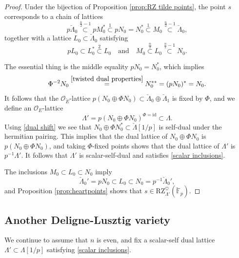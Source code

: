 \documentclass[11pt]{alggeom}
\newcommand{\F}{\mathbb F}
\newcommand{\co}{\mathcal O}
\begin{document}
\begin{proof}
Under the bijection of Proposition \ref{prop:RZ tilde points}, the point $s$ corresponds to a chain of lattices
\[
 p\breve{\Lambda}_0 \stackrel{\frac{n}{2}-1}{\subset}  p M_0^* \stackrel{1}{\subset}  pN_0 =  N_0^* \stackrel{1}{\subset}  M_0 \stackrel{ \frac{n}{2} -1}{\subset} \breve{\Lambda}_0  ,
 \]
together with a lattice $L_0 \subset \breve{\Lambda}_0$ satisfying
 \[
 pL_0 \subset  L_0^* \stackrel{2}{\subset} L_0\quad \mbox{and}\quad   M_0 \stackrel{\frac{n}{2}}{\subset} L_0 \stackrel{\frac{n}{2}-1}{\subset} N_0. 
 \]
 
 
  
The essential thing is the middle equality $pN_0 =  N_0^*$, which implies
\[
\Phi^{-2} N_0 \stackrel{ \eqref{twisted dual properties}}{=}N_0^{**} = ( p N_0) ^* = N_0.
\]
It follows that the $\co_{\breve{E}}$-lattice
$
 p( N_0 \oplus \Phi N_0) \subset \breve{\Lambda}_0  \oplus \breve{\Lambda}_1 
 $
 is fixed by $\Phi$, and we define an $\co_E$-lattice
 \[
 \Lambda' =  p( N_0 \oplus \Phi N_0)^{ \Phi=\mathrm{id} } \subset \Lambda.
 \]
  Using \eqref{dual shift} we see that 
  $
 N_0 \oplus \Phi N_0^*  \subset \breve{\Lambda}[1/p] 
$
is self-dual under the hermitian pairing.  
This implies that the dual lattice of $N_0 \oplus \Phi N_0$ is $p(N_0 \oplus \Phi N_0)$, and taking $\Phi$-fixed points shows that  the dual lattice of $\Lambda'$ is $p^{-1}\Lambda'$.  It follows that $\Lambda'$ is scalar-self-dual and satisfies \eqref{scalar inclusions}.

The inclusions $M_0 \subset L_0 \subset N_0$ imply
\[
 \breve{\Lambda}_0' = pN_0 \subset L_0 \subset  N_0= p^{-1}\breve{\Lambda}_0' ,
\]
and Proposition \ref{prop:heartpoints} shows that
$s\in \mathrm{RZ}_{\Lambda'}^\heartsuit   (\breve{\F}_p)$.
\end{proof}








\subsection{Another Deligne-Lusztig variety}



We continue to assume that $n$ is even, and fix a 
 scalar-self dual lattice $\Lambda' \subset \Lambda[1/p]$ satisfying \eqref{scalar inclusions}.
 
\end{document}
